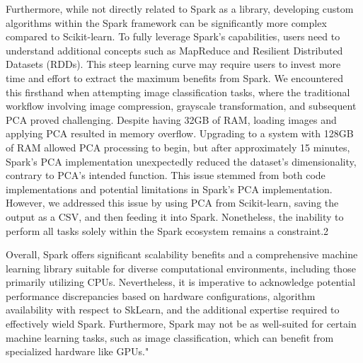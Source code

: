 \documentclass[12pt]{report}
\begin{document}
Furthermore, while not directly related to Spark as a library, developing custom algorithms within the Spark framework can be significantly more complex compared to Scikit-learn. To fully leverage Spark's capabilities, users need to understand additional concepts such as MapReduce and Resilient Distributed Datasets (RDDs). This steep learning curve may require users to invest more time and effort to extract the maximum benefits from Spark. We encountered this firsthand when attempting image classification tasks, where the traditional workflow involving image compression, grayscale transformation, and subsequent PCA proved challenging. Despite having 32GB of RAM, loading images and applying PCA resulted in memory overflow. Upgrading to a system with 128GB of RAM allowed PCA processing to begin, but after approximately 15 minutes, Spark's PCA implementation unexpectedly reduced the dataset's dimensionality, contrary to PCA's intended function. This issue stemmed from both code implementations and potential limitations in Spark's PCA implementation. However, we addressed this issue by using PCA from Scikit-learn, saving the output as a CSV, and then feeding it into Spark. Nonetheless, the inability to perform all tasks solely within the Spark ecosystem remains a constraint.2

Overall, Spark offers significant scalability benefits and a comprehensive machine learning library suitable for diverse computational environments, including those primarily utilizing CPUs. Nevertheless, it is imperative to acknowledge potential performance discrepancies based on hardware configurations, algorithm availability with respect to SkLearn, and the additional expertise required to effectively wield Spark. Furthermore, Spark may not be as well-suited for certain machine learning tasks, such as image classification, which can benefit from specialized hardware like GPUs."
\end{document}
